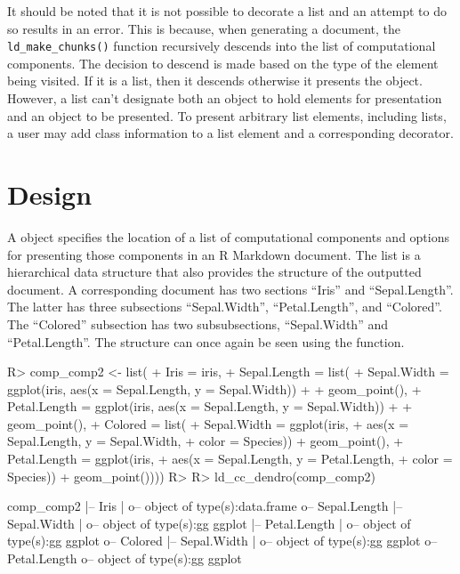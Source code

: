 \documentclass[
]{jss}
\begin{document}
It should be noted that it is not possible to decorate a list and an
attempt to do so results in an error. This is because, when generating a
document, the \texttt{ld\_make\_chunks()} function recursively descends
into the list of computational components. The decision to descend is
made based on the type of the element being visited. If it is a list,
then it descends otherwise it presents the object. However, a list can't
designate both an object to hold elements for presentation and an object
to be presented. To present arbitrary list elements, including lists, a
user may add class information to a list element and a corresponding
decorator.

\hypertarget{design}{%
\section{Design}\label{design}}

A  object specifies the location of a list of
computational components and options for presenting those components in
an R Markdown document. The list is a hierarchical data structure that
also provides the structure of the outputted document. A corresponding
document has two sections ``Iris'' and ``Sepal.Length''. The latter has
three subsections ``Sepal.Width'', ``Petal.Length'', and ``Colored''.
The ``Colored'' subsection has two subsubsections, ``Sepal.Width'' and
``Petal.Length''. The structure can once again be seen using the
 function.

\begin{CodeChunk}
\begin{CodeInput}
R> comp_comp2 <- list(
+   Iris = iris,
+   Sepal.Length = list(
+     Sepal.Width = ggplot(iris, aes(x = Sepal.Length, y = Sepal.Width)) + 
+       geom_point(),
+     Petal.Length = ggplot(iris, aes(x = Sepal.Length, y = Sepal.Width)) + 
+       geom_point(),
+     Colored = list(
+       Sepal.Width = ggplot(iris, 
+                           aes(x = Sepal.Length, y = Sepal.Width, 
+                               color = Species)) + geom_point(),
+       Petal.Length = ggplot(iris,
+                             aes(x = Sepal.Length, y = Petal.Length, 
+                                 color = Species)) + geom_point())))
R> 
R> ld_cc_dendro(comp_comp2)
\end{CodeInput}
\begin{CodeOutput}

comp_comp2
  |-- Iris
  |  o-- object of type(s):data.frame
  o-- Sepal.Length
   |-- Sepal.Width
   |  o-- object of type(s):gg ggplot
   |-- Petal.Length
   |  o-- object of type(s):gg ggplot
   o-- Colored
    |-- Sepal.Width
    |  o-- object of type(s):gg ggplot
    o-- Petal.Length
       o-- object of type(s):gg ggplot
\end{CodeOutput}
\end{CodeChunk}
\end{document}
